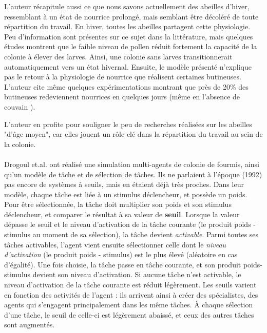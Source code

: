        L'auteur récapitule aussi ce que nous savons actuellement des abeilles d'hiver, ressemblant à un état de nourrice prolongé, mais semblant être décoléré de toute répartition du travail. En hiver, toutes les abeilles partagent cette physiologie. Peu d'information sont présentes sur ce sujet dans la littérature, mais quelques études montrent que le faible niveau de pollen réduit fortement la capacité de la colonie à élever des larves. Ainsi, une colonie sans larves transitionnerait automatiquement vers un état hivernal. Ensuite, le modèle présenté n'explique pas le retour à la physiologie de nourrice que réalisent certaines butineuses. L'auteur cite même quelques expérimentations montrant que près de 20\% des butineuses redeviennent nourrices en quelques jours (même en l'absence de couvain \cite{huang_regulation_1996}).
        
        L'auteur en profite pour souligner le peu de recherches réalisées sur les abeilles "d'âge moyen", car elles jouent un rôle clé dans la répartition du travail au sein de la colonie.
        
        \paragraph{}
        Drogoul et.al. \cite{drogoul_multi-agent_1992} ont réalisé une simulation multi-agents de colonie de fourmis, ainsi qu'un modèle de tâche et de sélection de tâches. Ils ne parlaient à l'époque (1992) pas encore de systèmes à seuils, mais en étaient déjà très proches. Dans leur modèle, chaque tâche est liée à un stimulus déclencheur, et possède un poids. Pour être sélectionnée, la tâche doit multiplier son poids et son stimulus déclencheur, et comparer le résultat à sa valeur de \textbf{seuil}. Lorsque la valeur dépasse le seuil et le niveau d'activation de la tâche courante (le produit poids - stimulus au moment de sa sélection), la tâche devient \textit{activable}. Parmi toutes ses tâches activables, l'agent vient ensuite sélectionner celle dont le \textit{niveau d'activation} (le produit poids - stimulus) est le plus élevé (aléatoire en cas d'égalité). Une fois choisie, la tâche passe en tâche courante, et son produit poids-stimulus devient son niveau d'activation. Si aucune tâche n'est activable, le niveau d'activation de la tâche courante est réduit légèrement. Les seuils varient en fonction des activités de l'agent : ils arrivent ainsi à créer des spécialistes, des agents qui s'engagent principalement dans les même tâches. À chaque sélection d'une tâche, le seuil de celle-ci est légèrement abaissé, et ceux des autres tâches sont augmentés.
        
